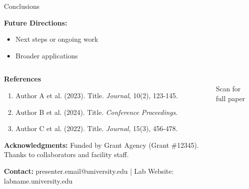 \documentclass[final,t]{beamer}
\begin{document}
\begin{frame}[t]
\begin{columns}[t]
\begin{column}{.3\linewidth}
\begin{block}{Conclusions}
        \vspace{0.5cm}
        
        \textbf{Future Directions:}
        \begin{itemize}
          \item Next steps or ongoing work
          \item Broader applications
        \end{itemize}
      \end{block}
      
    \end{column}
    
  \end{columns}
  
  \vspace{1cm}
  
  
  \begin{block}{}
    \footnotesize
    \begin{columns}[T]
      \begin{column}{.75\linewidth}
        \textbf{References}
        \begin{enumerate}
          \item Author A et al. (2023). Title. \textit{Journal}, 10(2), 123-145.
          \item Author B et al. (2024). Title. \textit{Conference Proceedings}.
          \item Author C et al. (2022). Title. \textit{Journal}, 15(3), 456-478.
        \end{enumerate}
        
        \vspace{0.3cm}
        
        \textbf{Acknowledgments:} Funded by Grant Agency (Grant \#12345). Thanks to collaborators and facility staff.
        
        \vspace{0.3cm}
        
        \textbf{Contact:} presenter.email@university.edu | Lab Website: labname.university.edu
      \end{column}
      
      \begin{column}{.2\linewidth}
        \centering
        \\
        \tiny Scan for full paper
      \end{column}
    \end{columns}
  \end{block}
  
\end{frame}
\end{document}
